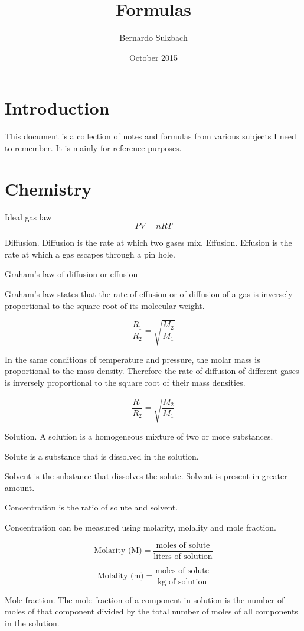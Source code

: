 \documentclass{book}
\title{Formulas}
\author{Bernardo Sulzbach}
\date{October 2015}
\begin{document}
\maketitle

\tableofcontents

\chapter{Introduction}
This document is a collection of notes and formulas from various subjects I
need to remember. It is mainly for reference purposes.

\chapter{Chemistry}

Ideal gas law
\[PV = nRT\]

Diffusion. Diffusion is the rate at which two gases mix.
Effusion. Effusion is the rate at which a gas escapes through a pin hole.

Graham's law of diffusion or effusion

Graham's law states that the rate of effusion or of diffusion of a gas is
inversely proportional to the square root of its molecular weight.

\[\frac{R_1}{R_2} = \sqrt{\frac{M_2}{M_1}}\]

In the same conditions of temperature and pressure, the molar mass is
proportional to the mass density. Therefore the rate of diffusion of different
gases is inversely proportional to the square root of their mass densities.

\[\frac{R_1}{R_2} = \sqrt{\frac{M_2}{M_1}}\]

Solution. A solution is a homogeneous mixture of two or more substances.

Solute is a substance that is dissolved in the solution.

Solvent is the substance that dissolves the solute. Solvent is present in
greater amount.

Concentration is the ratio of solute and solvent.

Concentration can be measured using molarity, molality and mole fraction.

\[\text{Molarity (M)} = \frac{\text{moles of solute}}{\text{liters of solution}}\]

\[\text{Molality (m)} = \frac{\text{moles of solute}}{\text{kg of solution}}\]

Mole fraction. The mole fraction of a component in solution is the number of
moles of that component divided by the total number of moles of all components
in the solution.
\end{document}
